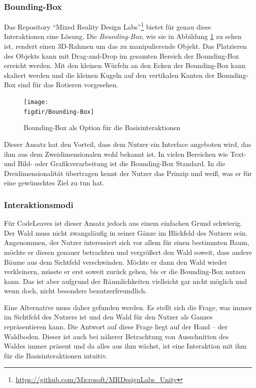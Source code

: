 \subsubsection*{Bounding-Box}

Das Repository "`Mixed Reality Design Labs"'\footnote{\url{https://github.com/Microsoft/MRDesignLabs_Unity}} bietet für genau diese Interaktionen eine Lösung. Die \textit{Bounding-Box}, wie sie in Abbildung \ref{fig:Bounding-Box} zu sehen ist, rendert einen 3D-Rahmen um das zu manipulierende Objekt. Das Platzieren des Objekts kann mit Drag-and-Drop im gesamten Bereich der Bounding-Box erreicht werden. Mit den kleinen Würfeln an den Ecken der Bounding-Box kann skaliert werden und die kleinen Kugeln auf den vertikalen Kanten der Bounding-Box sind für das Rotieren vorgesehen.

\begin{figure}[htb]
  \texttt{[image: \\figdir/Bounding-Box]}
  \caption{Bounding-Box als Option für die Basisinteraktionen \cite{microsoft2017mixed}}
  \label{fig:Bounding-Box}
\end{figure}

Dieser Ansatz hat den Vorteil, dass dem Nutzer ein Interface angeboten wird, das ihm aus dem Zweidimensionalen wohl bekannt ist. In vielen Bereichen wie Text- und Bild- oder Grafikverarbeitung ist die Bounding-Box Standard. In die Dreidimensionalität übertragen kennt der Nutzer das Prinzip und weiß, was er für eine gewünschtes Ziel zu tun hat.

\subsubsection*{Interaktionsmodi}

Für CodeLeaves ist dieser Ansatz jedoch aus einem einfachen Grund schwierig. Der Wald muss nicht zwangsläufig in seiner Gänze im Blickfeld des Nutzers sein. Angenommen, der Nutzer interessiert sich vor allem für einen bestimmten Baum, möchte er diesen genauer betrachten und vergrößert den Wald soweit, dass andere Bäume aus dem Sichtfeld verschwinden. Möchte er dann den Wald wieder verkleinern, müsste er erst soweit zurück gehen, bis er die Bounding-Box nutzen kann. Das ist aber aufgrund der Räumlichkeiten vielleicht gar nicht möglich und wenn doch, nicht besonders benutzerfreundlich.

Eine Alternative muss daher gefunden werden. Es stellt sich die Frage, was immer im Sichtfeld des Nutzers ist und den Wald für den Nutzer als Ganzes repräsentieren kann. Die Antwort auf diese Frage liegt auf der Hand -- der Waldboden. Dieser ist auch bei näherer Betrachtung von Ausschnitten des Waldes immer präsent und da alles aus ihm wächst, ist eine Interaktion mit ihm für die Basisinteraktionen intuitiv.


